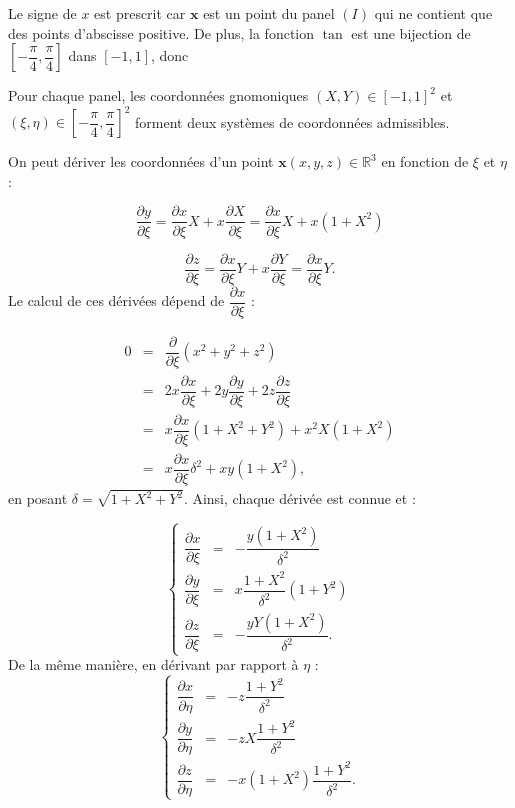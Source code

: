 Le signe de $x$ est prescrit car $\mathbf{x}$ est un point du panel $(I)$ qui ne contient que des points d'abscisse positive.
De plus, la fonction $\tan$ est une bijection de $\left[ -\dfrac{\pi}{4}, \dfrac{\pi}{4} \right]$ dans $\left[-1,1\right]$, donc

\begin{theoreme}
Pour chaque panel, les coordonnées gnomoniques $(X,Y) \in [-1,1]^2$ et $(\xi, \eta) \in \left[ - \dfrac{\pi}{4}, \dfrac{\pi}{4} \right]^2$ forment deux systèmes de coordonnées admissibles.
\end{theoreme}
On peut dériver les coordonnées d'un point $\mathbf{x}(x,y,z) \in \mathbb{R}^3$ en fonction de $\xi$ et $\eta$ :

\begin{equation}
\dfrac{\partial y}{\partial \xi} = \dfrac{\partial x}{\partial \xi} X + x \dfrac{\partial X}{\partial \xi} = \dfrac{\partial x}{\partial \xi} X + x(1+X^2)
\end{equation}

\begin{equation}
\dfrac{\partial z}{\partial \xi} = \dfrac{\partial x}{\partial \xi} Y + x \dfrac{\partial Y}{\partial \xi} = \dfrac{\partial x}{\partial \xi} Y .
\end{equation}
Le calcul de ces dérivées dépend de $\dfrac{\partial x}{\partial \xi}$ :

\begin{equation*}
\begin{array}{rcl}
0 & = & \dfrac{\partial}{\partial \xi} ( x^2+y^2+z^2) \\
  & = & 2x\dfrac{\partial x}{\partial \xi} + 2y\dfrac{\partial y}{\partial \xi}+ 2z\dfrac{\partial z}{\partial \xi} \\
  & = & x \dfrac{\partial x}{\partial \xi} ( 1 +X^2 + Y^2) + x^2 X (1+X^2)\\
  & = & x \dfrac{\partial x}{\partial \xi} \delta^2 + xy (1+X^2),
\end{array}
\end{equation*}
en posant $\delta = \sqrt{1+X^2+Y^2}$. Ainsi, chaque dérivée est connue et :

\begin{equation}
\left\lbrace
\begin{array}{rcl}
\dfrac{\partial x}{\partial \xi} & = & -\dfrac{y(1+X^2)}{\delta^2}\\
\dfrac{\partial y}{\partial \xi} & = & x \dfrac{1+X^2}{\delta^2} (1+Y^2)\\
\dfrac{\partial z}{\partial \xi} & = & - \dfrac{yY(1+X^2)}{\delta^2} .
\end{array}
\right.
\end{equation}
De la même manière, en dérivant par rapport à $\eta$ :
\begin{equation}
\left\lbrace
\begin{array}{rcl}
\dfrac{\partial x}{\partial \eta} & = & - z\dfrac{1+Y^2}{\delta^2}\\
\dfrac{\partial y}{\partial \eta} & = & - zX\dfrac{1+Y^2}{\delta^2}\\
\dfrac{\partial z}{\partial \eta} & = & - x(1+X^2) \dfrac{1+Y^2}{\delta^2}.
\end{array}
\right.
\end{equation}

